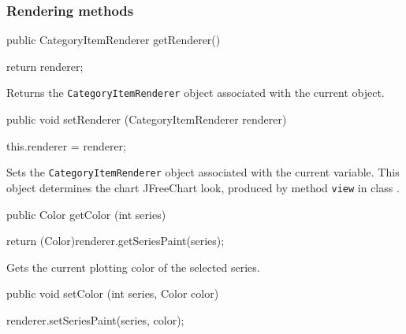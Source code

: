 \subsubsection*{Rendering methods}

\begin{code}

   public CategoryItemRenderer getRenderer() \begin{hide} {
      return renderer;
   }\end{hide}
\end{code}
\begin{tabb}
   Returns the \texttt{CategoryItemRenderer} object associated with the current object.
\end{tabb}
\begin{htmlonly}
\end{htmlonly}
\begin{code}

   public void setRenderer (CategoryItemRenderer renderer) \begin{hide} {
      this.renderer = renderer;
   }\end{hide}
\end{code}
\begin{tabb}
   Sets the \texttt{CategoryItemRenderer} object associated with the current variable.
   This object determines the chart JFreeChart look, produced by method
  \texttt{view} in class
   .
\end{tabb}
\begin{htmlonly}
\end{htmlonly}
\begin{code}

   public Color getColor (int series) \begin{hide} {
      return (Color)renderer.getSeriesPaint(series);
   }\end{hide}
\end{code}
\begin{tabb}
   Gets the current plotting color of the selected series.
\end{tabb}
\begin{htmlonly}
\end{htmlonly}
\begin{code}

   public void setColor (int series, Color color) \begin{hide} {
      renderer.setSeriesPaint(series, color);
   }\end{hide}
\end{code}
